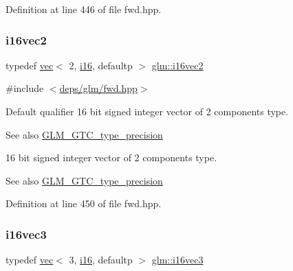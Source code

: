 Definition at line 446 of file fwd.\+hpp.

\mbox{\label{group__gtc__type__precision_gad912fd04abb876a5b806118ec6e0f283}} 
\subsubsection{\texorpdfstring{i16vec2}{i16vec2}}
{\footnotesize\ttfamily typedef \hyperlink{structglm_1_1vec}{vec}$<$ 2, \hyperlink{group__gtc__type__precision_ga35e5542ca05b29cc256fdafb8503d1fd}{i16}, defaultp $>$ \hyperlink{group__gtc__type__precision_gad912fd04abb876a5b806118ec6e0f283}{glm\+::i16vec2}}



{\ttfamily \#include $<$\hyperlink{fwd_8hpp}{deps/glm/fwd.\+hpp}$>$}

Default qualifier 16 bit signed integer vector of 2 components type. \begin{DoxySeeAlso}{See also}
\hyperlink{group__gtc__type__precision}{G\+L\+M\+\_\+\+G\+T\+C\+\_\+type\+\_\+precision}
\end{DoxySeeAlso}
16 bit signed integer vector of 2 components type. \begin{DoxySeeAlso}{See also}
\hyperlink{group__gtc__type__precision}{G\+L\+M\+\_\+\+G\+T\+C\+\_\+type\+\_\+precision} 
\end{DoxySeeAlso}


Definition at line 450 of file fwd.\+hpp.

\mbox{\label{group__gtc__type__precision_ga1f2b1dd6e4d9109be5f4433c8ff38cb8}} 
\subsubsection{\texorpdfstring{i16vec3}{i16vec3}}
{\footnotesize\ttfamily typedef \hyperlink{structglm_1_1vec}{vec}$<$ 3, \hyperlink{group__gtc__type__precision_ga35e5542ca05b29cc256fdafb8503d1fd}{i16}, defaultp $>$ \hyperlink{group__gtc__type__precision_ga1f2b1dd6e4d9109be5f4433c8ff38cb8}{glm\+::i16vec3}}



